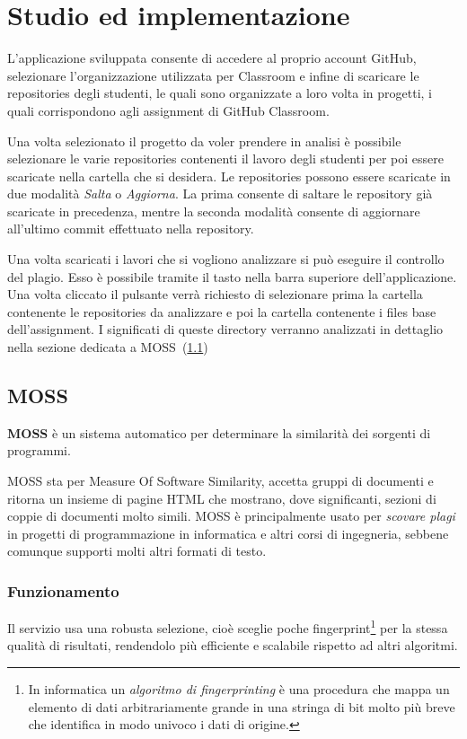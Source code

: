 \chapter{Studio ed implementazione}
	L'applicazione sviluppata consente di accedere al proprio account GitHub, selezionare l'organizzazione utilizzata per Classroom e infine di scaricare le repositories degli studenti, le quali sono organizzate a loro volta in progetti, i quali corrispondono agli assignment di GitHub Classroom.
	
	Una volta selezionato il progetto da voler prendere in analisi è possibile selezionare le varie repositories contenenti il lavoro degli studenti per poi essere scaricate nella cartella che si desidera.
	Le repositories possono essere scaricate in due modalità \textit{Salta} o \textit{Aggiorna}. La prima consente di saltare le repository già scaricate in precedenza, mentre la seconda modalità consente di aggiornare all'ultimo commit effettuato nella repository.
	
	Una volta scaricati i lavori che si vogliono analizzare si può eseguire il controllo del plagio. Esso è possibile tramite il tasto nella barra superiore dell'applicazione. Una volta cliccato il pulsante verrà richiesto di selezionare prima la cartella contenente le repositories da analizzare e poi la cartella contenente i files base dell'assignment.
	I significati di queste directory verranno analizzati in dettaglio nella sezione dedicata a MOSS~(\ref{def:MOSS})
	
	
	\section{MOSS}\label{def:MOSS}	
		\textbf{MOSS} è un sistema automatico per determinare la similarità dei sorgenti di programmi. 
		
		MOSS sta per Measure Of Software Similarity, accetta gruppi di documenti e ritorna un insieme di pagine HTML che mostrano, dove significanti, sezioni di coppie di documenti molto simili. MOSS è principalmente usato per \textit{scovare plagi} in progetti di programmazione in informatica e altri corsi di ingegneria, sebbene comunque supporti molti altri formati di testo. 
		
		\subsection*{Funzionamento~\citep{Clough2000}}
		Il servizio usa una robusta selezione, cioè sceglie poche fingerprint\footnote{In informatica un \textit{algoritmo di fingerprinting} è una procedura che mappa un elemento di dati arbitrariamente grande in una stringa di bit molto più breve che identifica in modo univoco i dati di origine.} per la stessa qualità di risultati, rendendolo più efficiente e scalabile rispetto ad altri algoritmi.
		
